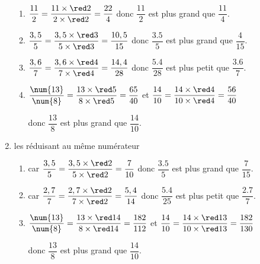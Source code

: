 \begin{methode}
\begin{spacing}{1.5}
\begin{enumerate}
            \begin{enumerate}
                \item $\dfrac{11}{2}=\dfrac{11\times {\red 2}}{2\times {\red 2}}=\dfrac{22}{4}$ donc $\dfrac{\num{11 }}{\num{2 }}$ est plus grand que $\dfrac{\num{11 }}{\num{4 }}$.
                \item $\dfrac{3,5}{5}=\dfrac{3,5\times {\red 3}}{5\times {\red 3}}=\dfrac{10,5}{15}$ donc $\dfrac{\num{3.5}}{\num{5 }}$ est plus grand que $\dfrac{\num{4  }}{\num{15}}$.
                \item $\dfrac{3,6}{7}=\dfrac{3,6\times {\red 4}}{7\times {\red 4}}=\dfrac{14,4}{28}$ donc $\dfrac{\num{5.4}}{\num{28}}$ est plus petit que $\dfrac{\num{3.6}}{\num{7 }}$.
                \item $\dfrac{\num{13}}{\num{8}} = \dfrac{13\times{\red 5}}{8\times {\red 5}} = \dfrac{65}{40}$ et $\dfrac{14}{10} = \dfrac{14\times{\red 4}}{10\times {\red 4}}=\dfrac{56}{40}$
                
                donc $\dfrac{\num{13}}{\num{8}}$ est plus grand que $\dfrac{\num{14}}{\num{10}}$.
            \end{enumerate}
            \item les réduisant au même numérateur
            \begin{enumerate}
                \item car $\dfrac{3,5}{5}=\dfrac{3,5\times {\red 2}}{5\times {\red 2}}=\dfrac{7}{10}$ donc $\dfrac{\num{3.5}}{\num{5 }}$ est plus grand que $\dfrac{\num{7  }}{\num{15}}$.
                \item car $\dfrac{2,7}{7}=\dfrac{2,7\times {\red 2}}{7\times {\red 2}}=\dfrac{5,4}{14}$ donc $\dfrac{\num{5.4}}{\num{25}}$ est plus petit que $\dfrac{\num{2.7}}{\num{7 }}$.
                \item $\dfrac{\num{13}}{\num{8}} = \dfrac{13\times{\red 14}}{8\times {\red 14}} = \dfrac{182}{112}$ et $\dfrac{14}{10} = \dfrac{14\times{\red 13}}{10\times {\red 13}}=\dfrac{182}{130}$
                
                donc $\dfrac{\num{13}}{\num{8}}$ est plus grand que $\dfrac{\num{14}}{\num{10}}$.
            \end{enumerate}
        \end{enumerate}
    \end{spacing}
\end{methode}

